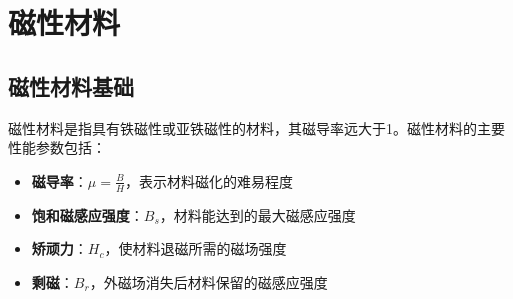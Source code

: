 
\chapter{磁性材料}
\label{chap:magnetic_materials}

\section{磁性材料基础}
\label{sec:magnetic_fundamentals}

磁性材料是指具有铁磁性或亚铁磁性的材料，其磁导率远大于1。磁性材料的主要性能参数包括：

\begin{itemize}
    \item \textbf{磁导率}：$\mu = \frac{B}{H}$，表示材料磁化的难易程度
    \item \textbf{饱和磁感应强度}：$B_s$，材料能达到的最大磁感应强度
    \item \textbf{矫顽力}：$H_c$，使材料退磁所需的磁场强度
    \item \textbf{剩磁}：$B_r$，外磁场消失后材料保留的磁感应强度
\end{itemize}

